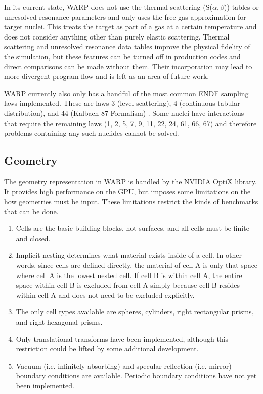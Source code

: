 \documentclass[preprint,12pt]{elsarticle}
\begin{document}
In its current state, WARP does not use the thermal scattering (S($\alpha,$$\beta$)) tables or unresolved resonance parameters and only uses the free-gas approximation for target nuclei.  This treats the target as part of a gas at a certain temperature and does not consider anything other than purely elastic scattering. Thermal scattering and unresolved resonance data tables improve the physical fidelity of the simulation, but these features can be turned off in production codes and direct comparisons can be made without them.  Their incorporation may lead to more divergent program flow and is left as an area of future work.

WARP currently also only has a handful of the most common ENDF sampling laws implemented.   These are laws 3 (level scattering), 4 (continuous tabular distribution), and 44 (Kalbach-87 Formalism) \cite{MCNP}.  Some nuclei have interactions that require the remaining laws (1, 2, 5, 7, 9, 11, 22, 24, 61, 66, 67) and therefore problems containing any such nuclides cannot be solved.

\subsection{Geometry}

The geometry representation in WARP is handled by the NVIDIA OptiX library.  It provides high performance on the GPU, but imposes some limitations on the how geometries must be input.  These limitations restrict the kinds of benchmarks that can be done.

\begin{enumerate}
\item Cells are the basic building blocks, not surfaces, and all cells must be finite and closed.
\item Implicit nesting determines what material exists inside of a cell.  In other words, since cells are defined directly, the material of cell A is only that space where cell A is the lowest nested cell.  If cell B is within cell A, the entire space within cell B is excluded from cell A simply because cell B resides within cell A and does not need to be excluded explicitly.
\item The only cell types available are spheres, cylinders, right rectangular prisms, and right hexagonal prisms.
\item Only translational transforms have been implemented, although this restriction could be lifted by some additional development.
\item Vacuum (i.e. infinitely absorbing) and specular reflection  (i.e. mirror) boundary conditions are available.  Periodic boundary conditions have not yet been implemented.
\end{enumerate}
\end{document}
